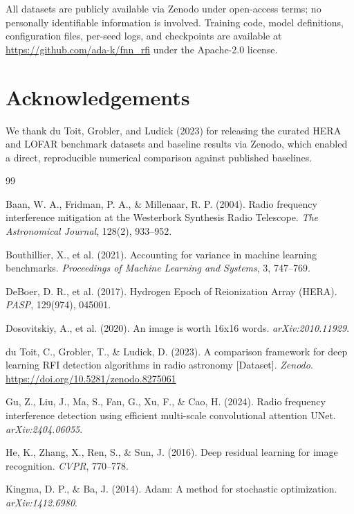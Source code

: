 \documentclass[11pt]{article}
\begin{document}
All datasets are publicly available via Zenodo \citep{dutoit2023} under open-access terms; no personally identifiable information is involved. Training code, model definitions, configuration files, per-seed logs, and checkpoints are available at \url{https://github.com/ada-k/fnn_rfi} under the Apache-2.0 license.

\section*{Acknowledgements}

We thank du Toit, Grobler, and Ludick (2023) for releasing the curated HERA and LOFAR benchmark datasets and baseline results via Zenodo, which enabled a direct, reproducible numerical comparison against published baselines.

\begin{thebibliography}{99}

 Baan, W. A., Fridman, P. A., \& Millenaar, R. P. (2004). Radio frequency interference mitigation at the Westerbork Synthesis Radio Telescope. \emph{The Astronomical Journal}, 128(2), 933--952.

 Bouthillier, X., et al. (2021). Accounting for variance in machine learning benchmarks. \emph{Proceedings of Machine Learning and Systems}, 3, 747--769.

 DeBoer, D. R., et al. (2017). Hydrogen Epoch of Reionization Array (HERA). \emph{PASP}, 129(974), 045001.

 Dosovitskiy, A., et al. (2020). An image is worth 16x16 words. \emph{arXiv:2010.11929}.

 du Toit, C., Grobler, T., \& Ludick, D. (2023). A comparison framework for deep learning RFI detection algorithms in radio astronomy [Dataset]. \emph{Zenodo}. \url{https://doi.org/10.5281/zenodo.8275061}

 Gu, Z., Liu, J., Ma, S., Fan, G., Xu, F., \& Cao, H. (2024). Radio frequency interference detection using efficient multi-scale convolutional attention UNet. \emph{arXiv:2404.06055}.

 He, K., Zhang, X., Ren, S., \& Sun, J. (2016). Deep residual learning for image recognition. \emph{CVPR}, 770--778.

 Kingma, D. P., \& Ba, J. (2014). Adam: A method for stochastic optimization. \emph{arXiv:1412.6980}.


\end{thebibliography}
\end{document}
